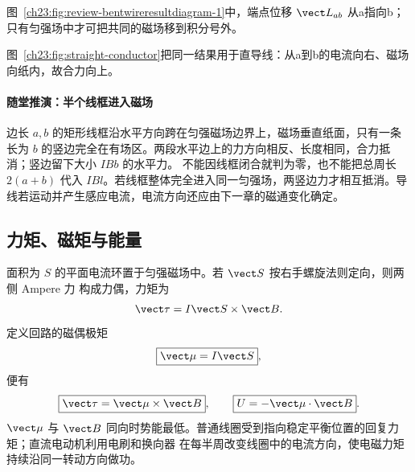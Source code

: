图~\ref{ch23:fig:review-bentwireresultdiagram-1}中，端点位移 $\vect L_{ab}$ 从a指向b；只有匀强场中才可把共同的磁场移到积分号外。
\par\noindent\begin{minipage}{\linewidth}
\bentWireResultDiagram
{}\label{ch23:fig:review-bentwireresultdiagram-1}
\end{minipage}\par\medskip
图~\ref{ch23:fig:straight-conductor}把同一结果用于直导线：从a到b的电流向右、磁场向纸内，故合力向上。
\par\noindent\begin{minipage}{\linewidth}
\straightConductorDiagram
{}\label{ch23:fig:straight-conductor}
\end{minipage}\par\medskip


\paragraph{随堂推演：半个线框进入磁场}
边长 $a,b$ 的矩形线框沿水平方向跨在匀强磁场边界上，磁场垂直纸面，只有一条长为 $b$ 的竖边完全在有场区。两段水平边上的力方向相反、长度相同，合力抵消；竖边留下大小 $IBb$ 的水平力。
不能因线框闭合就判为零，也不能把总周长 $2(a+b)$ 代入 $IBl$。若线框整体完全进入同一匀强场，两竖边力才相互抵消。导线若运动并产生感应电流，电流方向还应由下一章的磁通变化确定。

\subsection{力矩、磁矩与能量}

面积为 $S$ 的平面电流环置于匀强磁场中。若 $\vect S$ 按右手螺旋法则定向，则两侧 Ampere 力
构成力偶，力矩为
\begin{equation}
  \vect\tau=I\vect S\times\vect B.
\end{equation}
定义回路的磁偶极矩
\begin{equation}
  \boxed{\vect\mu=I\vect S},
\end{equation}
便有
\begin{equation}
  \boxed{\vect\tau=\vect\mu\times\vect B},
  \qquad
  \boxed{U=-\vect\mu\cdot\vect B}.
\end{equation}
$\vect\mu$ 与 $\vect B$ 同向时势能最低。普通线圈受到指向稳定平衡位置的回复力矩；直流电动机利用电刷和换向器
在每半周改变线圈中的电流方向，使电磁力矩持续沿同一转动方向做功。

